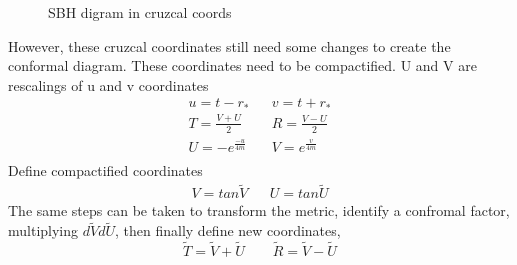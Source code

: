 \documentclass[10pt]{article}
\begin{document}
  \begin{figure}[!h]
               \centering
  \caption{SBH digram in cruzcal coords}
  \label{fig:lineup}
              \end{figure}  
              However, these cruzcal coordinates still need some changes to create the conformal diagram. These coordinates need to be compactified. 
              U and V are rescalings of u and v coordinates
              \begin{equation}
                 \begin{align}
                 u=t-r_* && v=t+r_* \\
                 T=\frac{V+U}{2}&&  R=\frac{V-U}{2}\\
                 U=-e^{\frac{-u}{4m}}&&V=e^{\frac{v}{4m}}\\
             \end{align}
              \end{equation}
              Define compactified coordinates
              \begin{equation}
              \begin{align}
                 V=tan\widetilde{V} && U=tan\widetilde{U}
                 \end{align}
              \end{equation}
              The same steps can be taken to transform the metric, identify a confromal factor, multiplying $d\widetilde{V}d\widetilde{U}$, then finally define new coordinates, 
              \begin{equation}
                  \widetilde{T}=\widetilde{V}+\widetilde{U}\qquad \widetilde{R}=\widetilde{V}-\widetilde{U}
              \end{equation}
              
\end{document}
